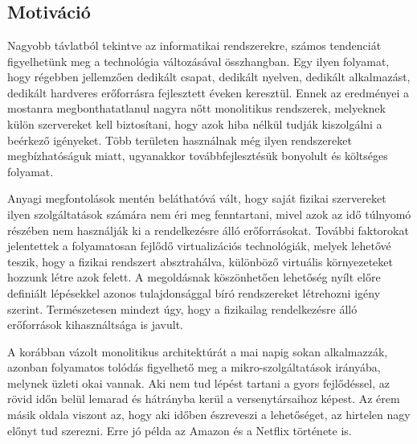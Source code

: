 \chapter{\bevezetes}

\section{Motiváció}

Nagyobb távlatból tekintve az informatikai rendszerekre, számos tendenciát figyelhetünk meg a technológia változásával összhangban.
Egy ilyen folyamat, hogy régebben jellemzően dedikált csapat, dedikált nyelven, dedikált alkalmazást, dedikált hardveres erőforrásra fejlesztett éveken keresztül. 
Ennek az eredményei a mostanra megbonthatatlanul nagyra nőtt monolitikus\citep{monoliticAndMicroserviceArchitecture} rendszerek, melyeknek külön szervereket kell biztosítani, hogy azok hiba nélkül tudják kiszolgálni a beérkező igényeket.
Több területen használnak még ilyen rendszereket megbízhatóságuk miatt, ugyanakkor továbbfejlesztésük bonyolult és költséges folyamat.

Anyagi megfontolások mentén beláthatóvá vált, hogy saját fizikai szervereket ilyen szolgáltatások számára nem éri meg fenntartani, mivel azok az idő túlnyomó részében nem használják ki a rendelkezésre álló erőforrásokat.
További faktorokat jelentettek a folyamatosan fejlődő virtualizációs technológiák, melyek lehetővé teszik, hogy a fizikai rendszert absztrahálva, különböző virtuális környezeteket hozzunk létre azok felett.
A megoldásnak köszönhetően lehetőség nyílt előre definiált lépésekkel azonos tulajdonsággal bíró rendszereket létrehozni igény szerint\citep{infrastuctureAsCode}. 
Természetesen mindezt úgy, hogy a fizikailag rendelkezésre álló erőforrások kihasználtsága is javult.

A korábban vázolt monolitikus architektúrát a mai napig sokan alkalmazzák, azonban folyamatos tolódás figyelhető meg a mikro-szolgáltatások irányába, melynek üzleti okai vannak. 
Aki nem tud lépést tartani a gyors fejlődéssel, az rövid időn belül lemarad és hátrányba kerül a versenytársaihoz képest. 
Az érem másik oldala viszont az, hogy aki időben észreveszi a lehetőséget, az hirtelen nagy előnyt tud szerezni. 
Erre jó példa az Amazon\citep{amazon} és a Netflix\citep{netflix} története is.  

